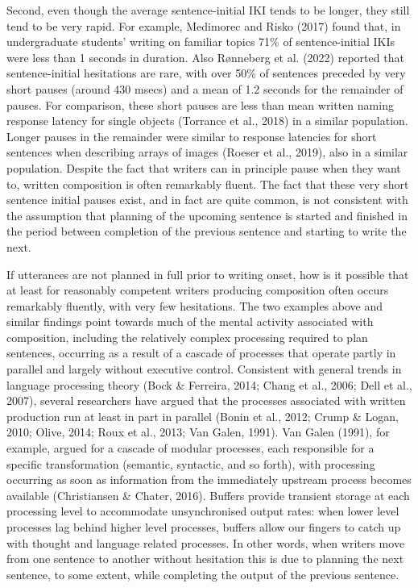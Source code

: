 \documentclass[
  man,floatsintext]{apa7}
\begin{document}
Second, even though the average sentence-initial IKI tends to be longer, they still tend to be very rapid. For example, Medimorec and Risko (2017) found that, in undergraduate students' writing on familiar topics 71\% of sentence-initial IKIs were less than 1 seconds in duration. Also Rønneberg et al. (2022) reported that sentence-initial hesitations are rare, with over 50\% of sentences preceded by very short pauses (around 430 msecs) and a mean of 1.2 seconds for the remainder of pauses. For comparison, these short pauses are less than mean written naming response latency for single objects (Torrance et al., 2018) in a similar population. Longer pauses in the remainder were similar to response latencies for short sentences when describing arrays of images (Roeser et al., 2019), also in a similar population. Despite the fact that writers can in principle pause when they want to, written composition is often remarkably fluent. The fact that these very short sentence initial pauses exist, and in fact are quite common, is not consistent with the assumption that planning of the upcoming sentence is started and finished in the period between completion of the previous sentence and starting to write the next.

If utterances are not planned in full prior to writing onset, how is it possible that at least for reasonably competent writers producing composition often occurs remarkably fluently, with very few hesitations. The two examples above and similar findings point towards much of the mental activity associated with composition, including the relatively complex processing required to plan sentences, occurring as a result of a cascade of processes that operate partly in parallel and largely without executive control. Consistent with general trends in language processing theory (Bock \& Ferreira, 2014; Chang et al., 2006; Dell et al., 2007), several researchers have argued that the processes associated with written production run at least in part in parallel (Bonin et al., 2012; Crump \& Logan, 2010; Olive, 2014; Roux et al., 2013; Van Galen, 1991). Van Galen (1991), for example, argued for a cascade of modular processes, each responsible for a specific transformation (semantic, syntactic, and so forth), with processing occurring as soon as information from the immediately upstream process becomes available (Christiansen \& Chater, 2016). Buffers provide transient storage at each processing level to accommodate unsynchronised output rates: when lower level processes lag behind higher level processes, buffers allow our fingers to catch up with thought and language related processes. In other words, when writers move from one sentence to another without hesitation this is due to planning the next sentence, to some extent, while completing the output of the previous sentence.
\end{document}

